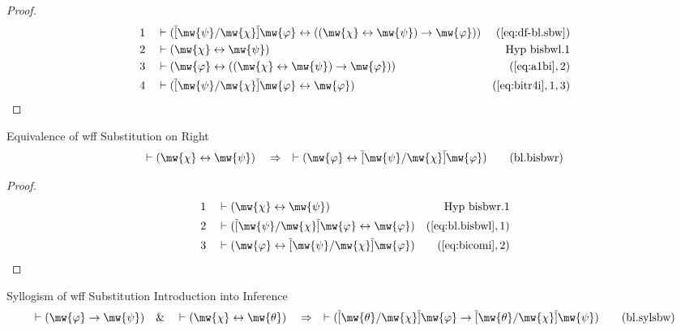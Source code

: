 \begin{proof}
\begin{align}
  1 &&  & \vdash ( \overline{[} \mw{\psi} / \mw{\chi} \overline{]} \mw{\varphi} \leftrightarrow ( ( \mw{\chi} \leftrightarrow \mw{\psi} ) \rightarrow \mw{\varphi} ) )&(\mbox{\ref{eq:df-bl.sbw}})\notag
  \\ 2 &&  & \vdash ( \mw{\chi} \leftrightarrow \mw{\psi} )&\text{Hyp~bisbwl.1}\notag%
  \\ 3 &&  & \vdash ( \mw{\varphi} \leftrightarrow ( ( \mw{\chi} \leftrightarrow \mw{\psi} ) \rightarrow \mw{\varphi} ) )&(\mbox{\ref{eq:a1bi}},2)\notag
  \\ 4 &&  & \vdash ( \overline{[} \mw{\psi} / \mw{\chi} \overline{]} \mw{\varphi} \leftrightarrow \mw{\varphi} )&(\mbox{\ref{eq:bitr4i}},1,3)\notag
\end{align}
\end{proof}

\begin{lemma} Equivalence of wff Substitution on Right
\begin{align}
\vdash ( \mw{\chi} \leftrightarrow \mw{\psi} )\quad\Rightarrow\quad \vdash ( \mw{\varphi} \leftrightarrow \overline{[} \mw{\psi} / \mw{\chi} \overline{]} \mw{\varphi} )\label{eq:bl.bisbwr}\tag{bl.bisbwr}
\end{align}
\end{lemma}

\begin{proof}
\begin{align}
  1 &&  & \vdash ( \mw{\chi} \leftrightarrow \mw{\psi} )&\text{Hyp~bisbwr.1}\notag%
  \\ 2 &&  & \vdash ( \overline{[} \mw{\psi} / \mw{\chi} \overline{]} \mw{\varphi} \leftrightarrow \mw{\varphi} )&(\mbox{\ref{eq:bl.bisbwl}},1)\notag
  \\ 3 &&  & \vdash ( \mw{\varphi} \leftrightarrow \overline{[} \mw{\psi} / \mw{\chi} \overline{]} \mw{\varphi} )&(\mbox{\ref{eq:bicomi}},2)\notag
\end{align}
\end{proof}

\begin{lemma} Syllogism of wff Substitution Introduction into Inference
\begin{align}
\vdash ( \mw{\varphi} \rightarrow \mw{\psi} )\quad\&\quad \vdash ( \mw{\chi} \leftrightarrow \mw{\theta} )\quad\Rightarrow\quad \vdash ( \overline{[} \mw{\theta} / \mw{\chi} \overline{]} \mw{\varphi} \rightarrow \overline{[} \mw{\theta} /
    \mw{\chi} \overline{]} \mw{\psi} )\label{eq:bl.sylsbw}\tag{bl.sylsbw}
\end{align}
\end{lemma}

